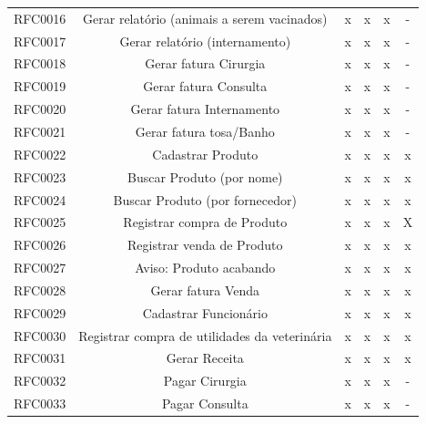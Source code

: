 \documentclass[12pt,openright,twoside,a4paper,english,french,spanish,brazil]{abntex2}
\begin{document}
\begin{landscape}
\begin{table}[!htpb]
\begin{small}
\begin{tabular}{rccccc}
    RFC0016 & Gerar relatório (animais a serem vacinados) & x & x & x & - \\
    RFC0017 & Gerar relatório (internamento) & x & x & x & - \\
    RFC0018 & Gerar fatura Cirurgia & x & x & x & - \\
    RFC0019 & Gerar fatura Consulta & x & x & x & - \\
    RFC0020 & Gerar fatura Internamento & x & x & x & - \\
    RFC0021 & Gerar fatura tosa/Banho & x & x & x & - \\
    RFC0022 & Cadastrar Produto & x & x & x & x \\
    RFC0023 & Buscar Produto (por nome) & x & x & x & x \\
    RFC0024 & Buscar Produto (por fornecedor) & x & x & x & x \\
    RFC0025 & Registrar compra de Produto & x & x & x & X \\
    RFC0026 & Registrar venda de Produto & x & x & x & x \\
    RFC0027 & Aviso: Produto acabando & x & x & x & x \\
    RFC0028 & Gerar fatura Venda & x & x & x & x \\
    RFC0029 & Cadastrar Funcionário & x & x & x & x \\
    RFC0030 & Registrar compra de utilidades da veterinária & x & x & x & x \\
    RFC0031 & Gerar Receita & x & x & x & x \\
    RFC0032 & Pagar Cirurgia & x & x & x & - \\
    RFC0033 & Pagar Consulta & x & x & x & - \\
    \bottomrule
    \end{tabular}%
  \label{tab:addlabel}%
\end{small}
\end{table}
\newpage


\end{landscape}
\end{document}
